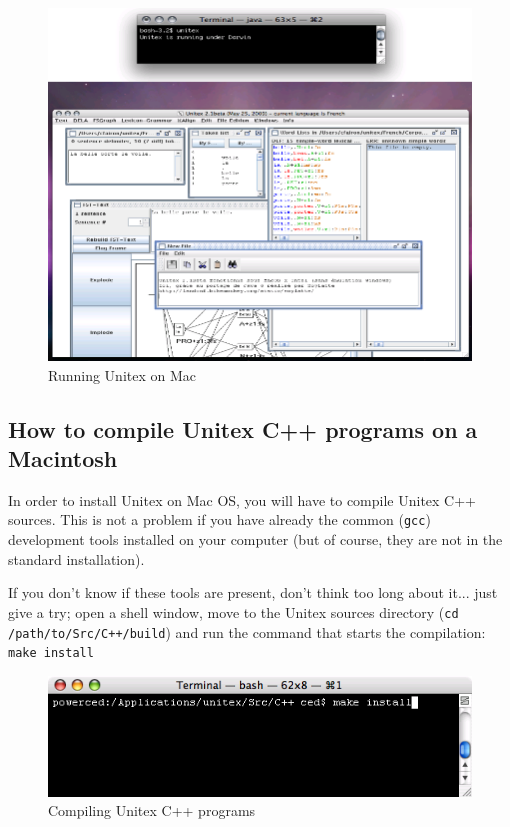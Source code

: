 \begin{figure}[!h]
\begin{center}
\includegraphics[width=13cm]{resources/img/fig-mac2.png}
\caption{Running Unitex on Mac\label{fig-mac2}}
\end{center}
\end{figure}

\subsection{How to compile Unitex C++ programs on a Macintosh}
\label{section-mac-compilation}
\noindent In order to install Unitex on Mac OS, you will have to compile
Unitex C++ sources. This is not a problem if you have already the common 
(\verb+gcc+) development tools installed on your computer (but of course, they
are not in the standard installation).

\bigskip
\noindent If you don't know if these tools are present, don't think too long
about it... just give a try; open a shell window, move to the Unitex sources
directory (\verb$cd /path/to/Src/C++/build$) and run the command that starts the
compilation: \verb+make install+

\begin{figure}[!h]
\begin{center}
\includegraphics[width=12cm]{resources/img/fig-mac3.png}
\caption{Compiling Unitex C++ programs\label{fig-mac3}}
\end{center}
\end{figure}

